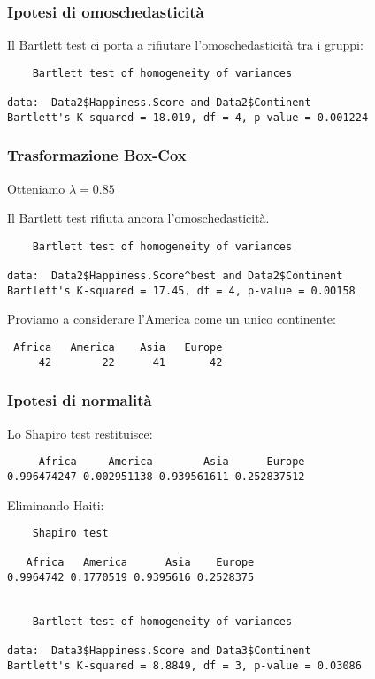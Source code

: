 \documentclass{beamer}
\newcommand{\fg}[2]{%
  \begin{center}
      \texttt{[image: \#2]}%
  \end{center}
}
\begin{document}
\begin{frame}[fragile]
    \frametitle{Ipotesi di omoschedasticità}

    Il Bartlett test ci porta a rifiutare l'omoschedasticità tra i gruppi:

    \tiny
    \begin{verbatim}
    Bartlett test of homogeneity of variances

data:  Data2$Happiness.Score and Data2$Continent
Bartlett's K-squared = 18.019, df = 4, p-value = 0.001224
    \end{verbatim}
\end{frame}

\begin{frame}
	\frametitle{Trasformazione Box-Cox}
	Otteniamo $\lambda = 0.85$
\end{frame}

\begin{frame}[fragile]
	Il Bartlett test rifiuta ancora l'omoschedasticità.
	{\tiny
	\begin{verbatim}
    Bartlett test of homogeneity of variances

data:  Data2$Happiness.Score^best and Data2$Continent
Bartlett's K-squared = 17.45, df = 4, p-value = 0.00158
	\end{verbatim}
	}
\end{frame}

\begin{frame}[fragile]
    Proviamo a considerare l'America come un unico continente:
    \tiny
    \begin{verbatim}
 Africa   America    Asia   Europe  
     42        22      41       42 
    \end{verbatim}

\end{frame}

\begin{frame}[fragile]
    \frametitle{Ipotesi di normalità}
    Lo Shapiro test restituisce:
    \tiny
    \begin{verbatim}
     Africa     America        Asia      Europe 
0.996474247 0.002951138 0.939561611 0.252837512
    \end{verbatim}
\end{frame}

\begin{frame}[fragile]
    Eliminando Haiti:
    \tiny
    \begin{verbatim}
    Shapiro test

   Africa   America      Asia    Europe 
0.9964742 0.1770519 0.9395616 0.2528375 


    Bartlett test of homogeneity of variances

data:  Data3$Happiness.Score and Data3$Continent
Bartlett's K-squared = 8.8849, df = 3, p-value = 0.03086
    \end{verbatim}
\end{frame}
\end{document}
